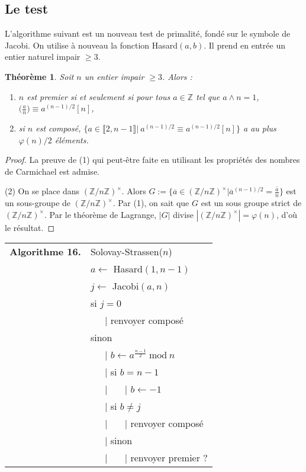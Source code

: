 \documentclass[12pt]{report}
\newtheorem{thm}{Théorème}[chapter]
\newcommand{\Z}{\mathbb{Z}}
\begin{document}
\subsection{Le test}

L'algorithme suivant est un nouveau test de primalité, fondé sur le symbole de Jacobi. On utilise à nouveau la fonction Hasard$(a,b)$. Il prend en entrée un entier naturel impair $\geq 3$.\\

\begin{thm} 
Soit  $n$ un entier impair $\geq 3$. Alors :\begin{enumerate}
\item $n$ est premier si et seulement si pour tous $a\in \Z$ tel que $a\wedge n=1$, $ \big( \tfrac{a}{n} \big)\equiv a^{(n-1)/2} [n]$,

\item si $n$ est composé, $\{a\in \llbracket 2,n-1\rrbracket|\ a^{(n-1)/2}\equiv a^{(n-1)/2} [n]\}$ a au plus $\varphi(n)/2$ éléments.
\end{enumerate}
\end{thm}

\begin{proof}
La preuve de (1) qui peut-être faite en utilisant les propriétés des nombres de Carmichael est admise.

(2) On se place dans $(\Z/n\Z)^\times$. Alors $G:= \{\overline{a}\in (\Z/n\Z)^\times |\overline{a}^{(n-1)/2}=\overline{\tfrac{a}{n}}\}$ est un sous-groupe de $(\Z/n\Z)^\times$.   Par (1), on sait que $G$ est un sous groupe strict de $(\Z/n\Z)^\times$. Par le théorème de Lagrange, $|G|$ divise $|(\Z/n\Z)^\times|=\varphi(n)$, d'où le résultat.
\end{proof}



\begin{tabular}{ll}
\textbf{Algorithme 16.} & Solovay-Strassen($n$)\\
           & $a \leftarrow$ Hasard$(1,n-1)$  \\
           & $j \leftarrow$ Jacobi$(a,n)$ \\
           &  si $j=0$  \\
           & \ \ \ {\rm |} renvoyer composé \\
           &  sinon  \\
           & \ \ \ {\rm |}  $b \leftarrow a^{\tfrac{n-1}{2}}\mathrm{\ mod\ }n$ \\
           & \ \ \ {\rm |} si $b=n-1$ \\
           & \ \ \ {\rm |} \ \ \ {\rm |} $b \leftarrow -1$ \\
           & \ \ \ {\rm |} si $b\neq j$\\
           &   \ \ \ {\rm |} \ \ \ {\rm |} renvoyer composé \\           
           & \ \ \ {\rm |} sinon \\
           & \ \ \ {\rm |} \ \ \ {\rm |} renvoyer premier ?
\end{tabular}\\
\end{document}
